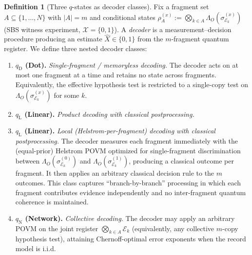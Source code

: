 \documentclass[11pt]{article}
\newcommand{\cE}{\mathcal{E}}
\newcommand{\cX}{\mathcal{X}}
\newcommand{\1}{\mathbf{1}}
\theoremstyle{definition}
\newtheorem{definition}{Definition}
\theoremstyle{plain}
\begin{document}
\begin{definition}[Three $q$-states as decoder classes]
\label{def:q-states}
Fix a fragment set $A\subseteq\{1,\dots,N\}$ with $|A|=m$ and conditional states
$\rho_A^{(x)}:=\bigotimes_{k\in A}\Lambda_O(\sigma^{(x)}_{\cE_k})$ (SBS witness experiment, $\cX=\{0,1\}$).
A \emph{decoder} is a measurement--decision procedure producing an estimate $\widehat{X}\in\{0,1\}$ from the $m$-fragment quantum register.
We define three nested decoder classes:
\begin{enumerate}[leftmargin=2.2em,label=(\roman*)]
\item \textbf{$q_{\mathrm{D}}$ (Dot).} \emph{Single-fragment / memoryless decoding.}
The decoder acts on at most one fragment at a time and retains no state across fragments.
Equivalently, the effective hypothesis test is restricted to a single-copy test on $\Lambda_O(\sigma^{(x)}_{\cE_k})$ for some $k$.

\item \textbf{$q_{\mathrm{L}}$ (Linear).} \emph{Product decoding with classical postprocessing.}
\item \textbf{$q_{\mathrm{L}}$ (Linear).} \emph{Local (Helstrom-per-fragment) decoding with classical postprocessing.}
The decoder measures each fragment immediately with the (equal-prior) Helstrom POVM optimized for single-fragment discrimination between
$\Lambda_O(\sigma^{(0)}_{\cE_k})$ and $\Lambda_O(\sigma^{(1)}_{\cE_k})$, producing a classical outcome per fragment.
It then applies an arbitrary classical decision rule to the $m$ outcomes.
This class captures ``branch-by-branch'' processing in which each fragment contributes evidence independently and no inter-fragment quantum coherence is maintained.

\item \textbf{$q_{\mathrm{N}}$ (Network).} \emph{Collective decoding.}
The decoder may apply an arbitrary POVM on the joint register $\bigotimes_{k\in A}\cE_k$ (equivalently, any collective $m$-copy hypothesis test), attaining Chernoff-optimal error exponents when the record model is i.i.d.
\end{enumerate}
\end{definition}
\end{document}
